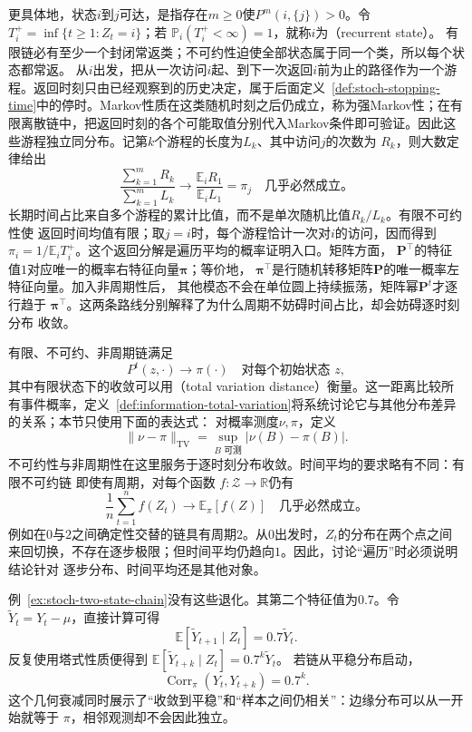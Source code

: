 更具体地，状态$i$到$j$可达，是指存在$m\geq0$使$P^m(i,\{j\})>0$。令
$T_i^+=\inf\{t\geq1:Z_t=i\}$；若
$\mathbb{P}_i(T_i^+<\infty)=1$，就称$i$为（recurrent state）。
有限链必有至少一个封闭常返类；不可约性迫使全部状态属于同一个类，所以每个状态都常返。
从$i$出发，把从一次访问$i$起、到下一次返回$i$前为止的路径作为一个游程。返回时刻只由已经观察到的历史决定，属于后面定义~\ref{def:stoch-stopping-time}中的停时。Markov性质在这类随机时刻之后仍成立，称为强Markov性；在有限离散链中，把返回时刻的各个可能取值分别代入Markov条件即可验证。因此这些游程独立同分布。记第$k$个游程的长度为$L_k$、其中访问$j$的次数为
$R_k$，则大数定律给出
\[
  \frac{\sum_{k=1}^{m}R_k}{\sum_{k=1}^{m}L_k}
  \longrightarrow
  \frac{\mathbb{E}_iR_1}{\mathbb{E}_iL_1}
  =\pi_j
  \quad\text{几乎必然成立。}
\]
长期时间占比来自多个游程的累计比值，而不是单次随机比值$R_k/L_k$。有限不可约性使
返回时间均值有限；取$j=i$时，每个游程恰计一次对$i$的访问，因而得到
$\pi_i=1/\mathbb{E}_iT_i^+$。这个返回分解是遍历平均的概率证明入口。矩阵方面，
$\bm{P}^{\top}$的特征值$1$对应唯一的概率右特征向量$\bm{\pi}$；等价地，
$\bm{\pi}^{\top}$是行随机转移矩阵$\bm{P}$的唯一概率左特征向量。加入非周期性后，
其他模态不会在单位圆上持续振荡，矩阵幂$\bm{P}^t$才逐行趋于
$\bm{\pi}^{\top}$。这两条路线分别解释了为什么周期不妨碍时间占比，却会妨碍逐时刻分布
收敛。

有限、不可约、非周期链满足
\begin{equation}
  P^t(z,\cdot)\longrightarrow\pi(\cdot)
  \quad\text{对每个初始状态 }z,
  \label{eq:stoch-finite-chain-distribution-convergence}
\end{equation}
其中有限状态下的收敛可以用（total variation distance）衡量。这一距离比较所有事件概率，定义~\ref{def:information-total-variation}将系统讨论它与其他分布差异的关系；本节只使用下面的表达式：
对概率测度$\nu,\pi$，定义
\[
  \lVert\nu-\pi\rVert_{\mathrm{TV}}
  =
  \sup_{B\text{ 可测}}|\nu(B)-\pi(B)|.
\]
不可约性与非周期性在这里服务于逐时刻分布收敛。时间平均的要求略有不同：有限不可约链
即使有周期，对每个函数
$f:\mathcal{Z}\to\mathbb{R}$仍有
\begin{equation}
  \frac1n\sum_{t=1}^{n}f(Z_t)\longrightarrow\mathbb{E}_{\pi}[f(Z)]
  \quad\text{几乎必然成立。}
  \label{eq:stoch-markov-ergodic-average}
\end{equation}
例如在$0$与$2$之间确定性交替的链具有周期$2$。从$0$出发时，$Z_t$的分布在两个点之间
来回切换，不存在逐步极限；但时间平均仍趋向$1$。因此，讨论“遍历”时必须说明结论针对
逐步分布、时间平均还是其他对象。

例~\ref{ex:stoch-two-state-chain}没有这些退化。其第二个特征值为$0.7$。令
$\widetilde{Y}_t=Y_t-\mu$，直接计算可得
\begin{equation}
  \mathbb{E}[\widetilde{Y}_{t+1}\mid Z_t]=0.7\widetilde{Y}_t.
  \label{eq:stoch-two-state-eigenfunction}
\end{equation}
反复使用塔式性质便得到
$\mathbb{E}[\widetilde{Y}_{t+k}\mid Z_t]=0.7^k\widetilde{Y}_t$。
若链从平稳分布启动，
\begin{equation}
  \operatorname{Corr}_{\pi}(Y_t,Y_{t+k})=0.7^k.
  \label{eq:stoch-two-state-autocorrelation}
\end{equation}
这个几何衰减同时展示了“收敛到平稳”和“样本之间仍相关”：边缘分布可以从一开始就等于
$\pi$，相邻观测却不会因此独立。

